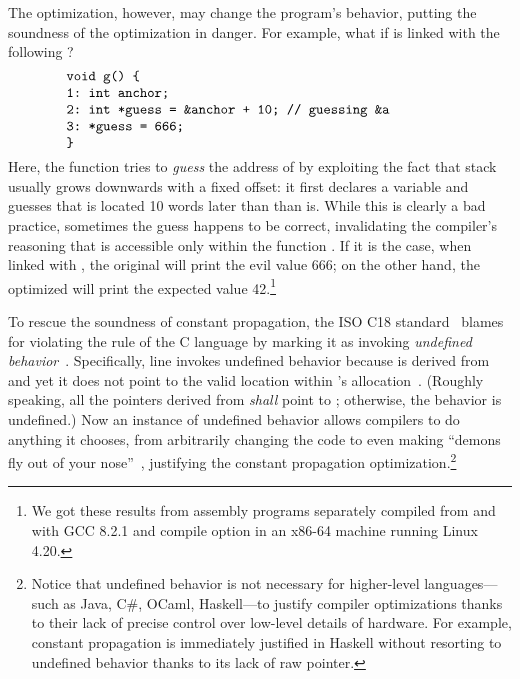 The optimization, however, may change the program's behavior, putting the soundness of the
optimization in danger.  For example, what if  is linked with the following ?
%
\[
\begin{minipage}{0.8\textwidth}
\begin{verbatim}
void g() {
1: int anchor;
2: int *guess = &anchor + 10; // guessing &a
3: *guess = 666;
}
\end{verbatim}
\end{minipage}
\]
%
\noindent Here, the function  tries to \emph{guess} the address of  by exploiting
the fact that stack usually grows downwards with a fixed offset: it first declares a variable
 and guesses that  is located 10 words later than than  is.  While
this is clearly a bad practice, sometimes the guess happens to be correct, invalidating the
compiler's reasoning that  is accessible only within the function .  If it is the
case, when linked with , the original  will print the evil value 666; on the
other hand, the optimized  will print the expected value 42.\footnote{We got these results
  from assembly programs separately compiled from  and  with GCC 8.2.1 and
  compile option  in an x86-64 machine running Linux 4.20.}

To rescue the soundness of constant propagation, the ISO C18 standard~\cite{c18} blames 
for violating the rule of the C language by marking it as invoking \emph{undefined
  behavior}~\cite[\S3.4.3p1]{c18}.  Specifically, line  invokes undefined behavior because
 is derived from  and yet it does not point to the valid location within
's allocation~\cite[\S6.5.6p8]{c18}.  (Roughly speaking, all the pointers derived from
 \emph{shall} point to ; otherwise, the behavior is undefined.)  Now an
instance of undefined behavior allows compilers to do anything it chooses, from arbitrarily changing
the code to even making ``demons fly out of your nose''~\cite{nasal-demons}, justifying the constant
propagation optimization.\footnote{Notice that undefined behavior is not necessary for higher-level
  languages---such as Java, C\#, OCaml, Haskell---to justify compiler optimizations thanks to their
  lack of precise control over low-level details of hardware.  For example, constant propagation is
  immediately justified in Haskell without resorting to undefined behavior thanks to its lack of raw
  pointer.}

